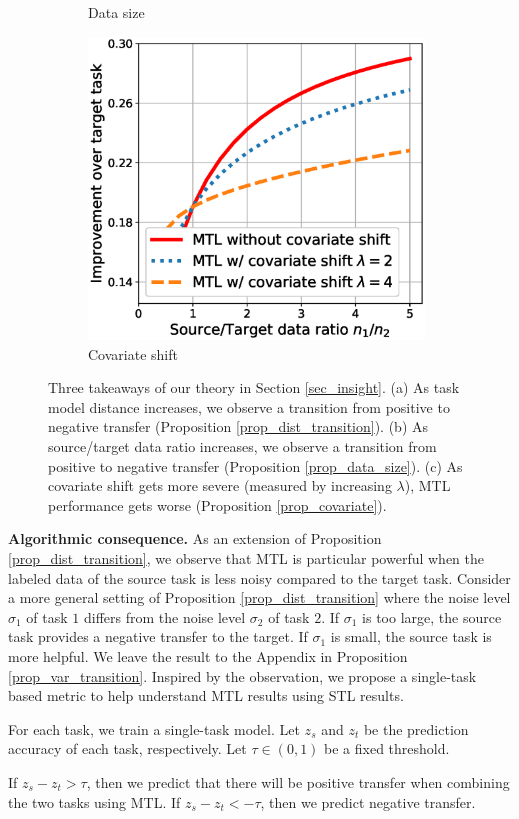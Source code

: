 \begin{figure}
\begin{subfigure}[b]{0.32\textwidth}
		\caption{Data size}
	\end{subfigure}\hfill
	\begin{subfigure}[b]{0.32\textwidth}
		\centering
		\includegraphics[width=0.98\textwidth]{figures/complementary.eps}
		\caption{Covariate shift}
		\label{fig_covariate}
	\end{subfigure}
	\caption{Three takeaways of our theory in Section \ref{sec_insight}.
	(a) As task model distance increases, we observe a transition from positive to negative transfer  (Proposition \ref{prop_dist_transition}).
	(b) As source/target data ratio increases, we observe a transition from positive to negative transfer (Proposition \ref{prop_data_size}).
	(c) As covariate shift gets more severe (measured by increasing $\lambda$), MTL performance gets worse (Proposition \ref{prop_covariate}).}
	\label{fig_model_shift_phasetrans}
\end{figure}

\textbf{Algorithmic consequence.}
As an extension of Proposition \ref{prop_dist_transition}, we observe that MTL is particular powerful when the labeled data of the source task is less noisy compared to the target task.
Consider a more general setting of Proposition \ref{prop_dist_transition} where the noise level $\sigma_1$ of task $1$ differs from the noise level $\sigma_2$ of task $2$.
If $\sigma_1$ is too large, the source task provides a negative transfer to the target.
If $\sigma_1$ is small, the source task is more helpful.
We leave the result to the Appendix in Proposition \ref{prop_var_transition}.
Inspired by the observation, we propose a single-task based metric to help understand MTL results using STL results.
\squishlist
	\item For each task, we train a single-task model.
	Let $z_s$ and $z_t$ be the prediction accuracy of each task, respectively.
	Let $\tau\in(0, 1)$ be a fixed threshold.
	\item If $z_s - z_t > \tau$, then we predict that there will be positive transfer when combining the two tasks using MTL.
	If $z_s - z_t < -\tau$, then we predict negative transfer.
\squishend

